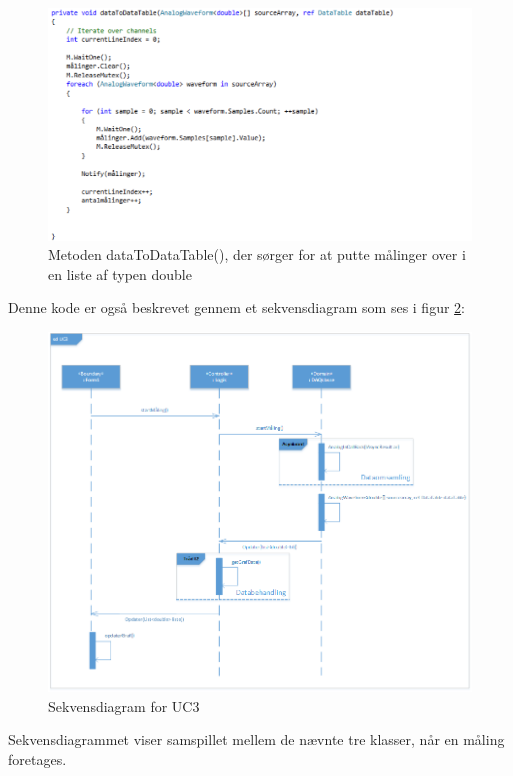 \begin{figure}[H]
	\includegraphics[width=1.3\textwidth]{Figurer/Jeppe/4}
	\caption{Metoden dataToDataTable(), der sørger for at putte målinger over i en liste af typen double}
	\label{kode4}
\end{figure}

Denne kode er også beskrevet gennem et sekvensdiagram som ses i figur \ref{UC3sekvens}:

\begin{figure}[H]
	\includegraphics[width=1\textwidth]{Figurer/Softwareimplementering/UC3_sekvens}
	\caption{Sekvensdiagram for UC3}
	\label{UC3sekvens}
\end{figure}
Sekvensdiagrammet viser samspillet mellem de nævnte tre klasser, når en måling foretages.\\[2ex]


